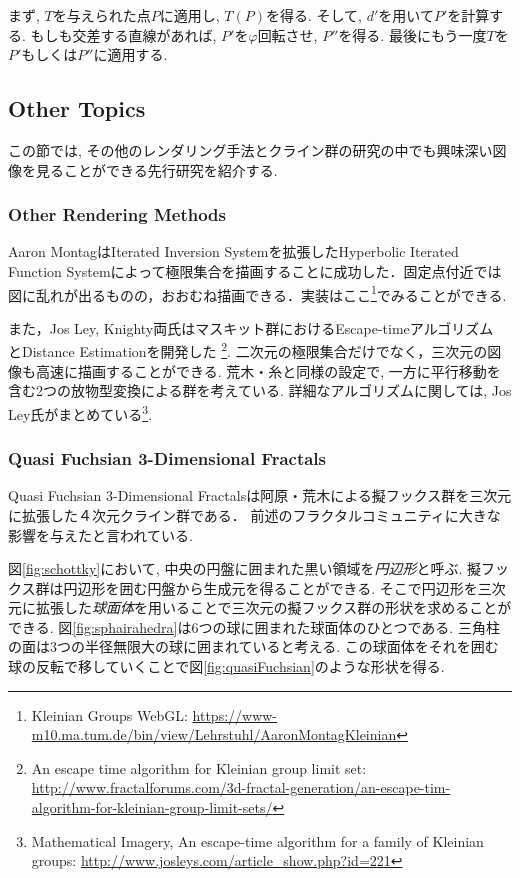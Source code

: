 まず, $T$を与えられた点$P$に適用し, $T(P)$を得る.
そして, $d'$を用いて$P'$を計算する.
もしも交差する直線があれば, $P'$を$\varphi$回転させ, $P''$を得る.
最後にもう一度$T$を$P'$もしくは$P''$に適用する.

\subsection{Other Topics}

この節では, その他のレンダリング手法とクライン群の研究の中でも興味深い図像を見ることができる先行研究を紹介する.

\subsubsection{Other Rendering Methods}
Aaron MontagはIterated Inversion Systemを拡張したHyperbolic Iterated Function Systemによって極限集合を描画することに成功した\cite{hyperbolicIFS}．固定点付近では図に乱れが出るものの，おおむね描画できる．実装はここ\footnote{Kleinian Groups WebGL: \url{https://www-m10.ma.tum.de/bin/view/Lehrstuhl/AaronMontagKleinian}}でみることができる.

また，Jos Ley, Knighty両氏はマスキット群におけるEscape-timeアルゴリズム
とDistance Estimationを開発した
\footnote{An escape time algorithm for Kleinian group limit set:\\ \quad
\quad \url{http://www.fractalforums.com/3d-fractal-generation/an-escape-tim-algorithm-for-kleinian-group-limit-sets/}}.
 二次元の極限集合だけでなく，三次元の図像も高速に描画することができる.
荒木・糸\cite{maskit}と同様の設定で, 一方に平行移動を含む2つの放物型変換による群を考えている.
詳細なアルゴリズムに関しては, Jos Ley氏がまとめている\footnote{Mathematical Imagery, An escape-time algorithm for a family of Kleinian groups: \url{http://www.josleys.com/article_show.php?id=221}}.

\subsubsection{Quasi Fuchsian 3-Dimensional Fractals}

Quasi Fuchsian 3-Dimensional Fractalsは阿原・荒木による擬フックス群を三次元に拡張した４次元クライン群である\cite{sphairahedra}\cite{sphairahedraJa}．
前述のフラクタルコミュニティに大きな影響を与えたと言われている.

図\ref{fig:schottky}において, 中央の円盤に囲まれた黒い領域を\emph{円辺形}と呼ぶ.
擬フックス群は円辺形を囲む円盤から生成元を得ることができる.
そこで円辺形を三次元に拡張した\emph{球面体}を用いることで三次元の擬フックス群の形状を求めることができる.
図\ref{fig:sphairahedra}は6つの球に囲まれた球面体のひとつである.
三角柱の面は3つの半径無限大の球に囲まれていると考える.
この球面体をそれを囲む球の反転で移していくことで図\ref{fig:quasiFuchsian}のような形状を得る.

